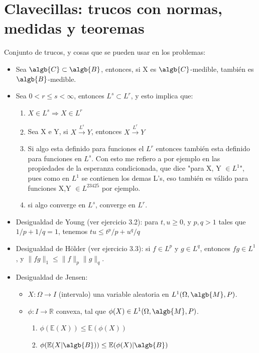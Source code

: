 \documentclass{apuntes}
\begin{document}
\section{Clavecillas: trucos con normas, medidas y teoremas}

Conjunto de trucos, y cosas que se pueden usar en los problemas:

\begin{itemize}
\item Sea $\algb{C} \subset \algb{B}$, entonces, si X es $\algb{C}$-medible, también es $\algb{B}$-medible.

\item Sea $0<r\leq s<\infty$, entonces $L^s \subset L^r$, y esto implica que:
\begin{enumerate}
\item  $X \in L^s \Rightarrow X \in L^r$
\item Sea X e Y, si $X \stackrel{L^s}{\rightarrow} Y$, entonces $X \stackrel{L^r}{\rightarrow} Y$
\item Si algo esta definido para funciones el $L^r$ entonces también esta definido para funciones en $L^s$. Con esto me refiero a por ejemplo en las propiedades de la esperanza condicionada, que dice "para X, Y $\in L^1$", pues como en $L^1$ se contienen los demas L's, eso también es válido para funciones X,Y $\in L^{23425}$ por ejemplo.
\item si algo converge en $L^s$, converge en $L^r$.
\end{enumerate}

\item Desigualdad de Young (ver ejercicio 3.2): para $t, u \ge 0$, y $p,q > 1$ tales que $1/p + 1/q =1$, tenemos $tu \le t^p/ p + u^q/ q$
\item Desigualdad de Hölder (ver ejercicio 3.3): si $f\in L^p$ y $g\in L^q$, entonces $fg\in L^1$, y $\|fg\|_1 \le \|f\|_p\|g\|_q$.
\item Desigualdad de Jensen:
\begin{itemize}
\item $X: \Omega \rightarrow I$ (intervalo) una variable aleatoria en $L^1(\Omega, \algb{M},P)$.
\item $\phi: I \rightarrow \mathbb{R}$ convexa, tal que $\phi(X) \in L^1(\Omega,\algb{M},P)$.
\begin{enumerate}
\item $\phi(\mathbb{E}(X)) \leq \mathbb{E}(\phi(X))$
\item $\phi(\mathbb{E}(X|\algb{B})) \leq \mathbb{E}(\phi(X)|\algb{B})$


\end{enumerate}
\end{itemize}
\end{itemize}
\end{document}
